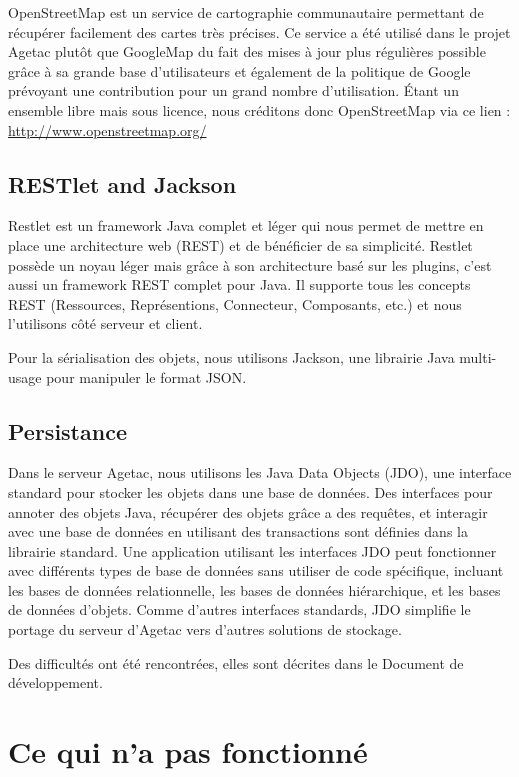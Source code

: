 \documentclass{article}
\begin{document}
OpenStreetMap est un service de cartographie communautaire permettant de récupérer facilement des cartes très précises. Ce service a été utilisé dans le projet Agetac plutôt que GoogleMap du fait des mises à jour plus régulières possible grâce à sa grande base d’utilisateurs et également de la politique de Google prévoyant une contribution pour un grand nombre d’utilisation. Étant un ensemble libre mais sous licence, nous créditons donc OpenStreetMap via ce lien : \url{http://www.openstreetmap.org/}

\subsection{RESTlet and Jackson}

Restlet est un framework Java complet et léger qui nous permet de mettre en place une architecture web (REST) et de bénéficier de sa simplicité. Restlet possède un noyau léger mais grâce à son architecture basé sur les plugins, c’est aussi un framework REST complet pour Java. Il supporte tous les concepts REST (Ressources, Représentions, Connecteur, Composants, etc.) et nous l'utilisons côté serveur et client.

Pour la sérialisation des objets, nous utilisons Jackson, une librairie Java multi-usage pour manipuler le format JSON. 

\subsection{Persistance}

Dans le serveur Agetac, nous utilisons les Java Data Objects (JDO), une interface standard pour stocker les objets dans une base de données. Des interfaces pour annoter des objets Java, récupérer des objets grâce a des requêtes, et interagir avec une base de données en utilisant des transactions sont définies dans la librairie standard. Une application utilisant les interfaces JDO peut fonctionner avec différents types de base de données sans utiliser de code spécifique, incluant les bases de données relationnelle, les bases de données hiérarchique, et les bases de données d’objets. Comme d’autres interfaces standards, JDO simplifie le portage du serveur d’Agetac vers d’autres solutions de stockage.

Des difficultés ont été rencontrées, elles sont décrites dans le Document de développement.

\newpage
\section{Ce qui n'a pas fonctionné}
\end{document}
